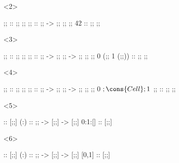 \documentclass[17pt]{beamer}
\renewcommand{\(}[1]{\begin{columns}[#1]}
\renewcommand{\)}{\end{columns}}
\newcommand{\<}[1]{\begin{column}{#1}}
\renewcommand{\>}{\end{column}}
\begin{document}
\begin{frame}[fragile]
\begin{minipage}[t][.3\textheight]{\textwidth}
\begin{center}
\begin{onlyenv}<2>
\begin{code}
                   ;; ::      ;; ;;
                   ;;    :: ;; -> ;; ;;
                   ;; 42 ::      ;; ;;
\end{code}
\end{onlyenv}
\begin{onlyenv}<3>
\begin{code}
                       ;; :: ;; ;;
                      ;; :: ;; -> ;; ;; -> ;; ;;
     ;; 0 (;; 1 (;;)) :: ;; ;;
\end{code}
\end{onlyenv}
\begin{onlyenv}<4>
\begin{code}
                       ;; :: ;; ;;
                      ;; :: ;; -> ;; ;; -> ;; ;;
     ;; 0 $ ;\cons{Cell}; 1 $ ;; :: ;; ;;
\end{code}
\end{onlyenv}
\begin{onlyenv}<5>
\begin{code}
                        [] :: [;;]
                       (:) :: ;; -> [;;] -> [;;]
                    0:1:[] :: [;;]
\end{code}
\end{onlyenv}
\begin{onlyenv}<6>
\begin{code}
                        [] :: [;;]
                       (:) :: ;; -> [;;] -> [;;]
                     [0,1] :: [;;]
\end{code}
\end{onlyenv}
\end{center}
\end{minipage}
\end{frame}
\end{document}
